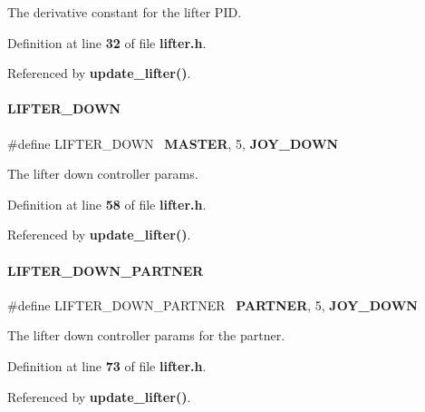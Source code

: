 The derivative constant for the lifter P\+ID. 



Definition at line \textbf{ 32} of file \textbf{ lifter.\+h}.



Referenced by \textbf{ update\+\_\+lifter()}.

\mbox{\label{lifter_8h_a12f8c1de242a92f5694e6b80b990773a}} 
\paragraph{L\+I\+F\+T\+E\+R\+\_\+\+D\+O\+WN}
{\footnotesize\ttfamily \#define L\+I\+F\+T\+E\+R\+\_\+\+D\+O\+WN~\textbf{ M\+A\+S\+T\+ER}, 5, \textbf{ J\+O\+Y\+\_\+\+D\+O\+WN}}



The lifter down controller params. 



Definition at line \textbf{ 58} of file \textbf{ lifter.\+h}.



Referenced by \textbf{ update\+\_\+lifter()}.

\mbox{\label{lifter_8h_a40a0b4dc0172c4133a34d5e3d8b69f9a}} 
\paragraph{L\+I\+F\+T\+E\+R\+\_\+\+D\+O\+W\+N\+\_\+\+P\+A\+R\+T\+N\+ER}
{\footnotesize\ttfamily \#define L\+I\+F\+T\+E\+R\+\_\+\+D\+O\+W\+N\+\_\+\+P\+A\+R\+T\+N\+ER~\textbf{ P\+A\+R\+T\+N\+ER}, 5, \textbf{ J\+O\+Y\+\_\+\+D\+O\+WN}}



The lifter down controller params for the partner. 



Definition at line \textbf{ 73} of file \textbf{ lifter.\+h}.



Referenced by \textbf{ update\+\_\+lifter()}.

